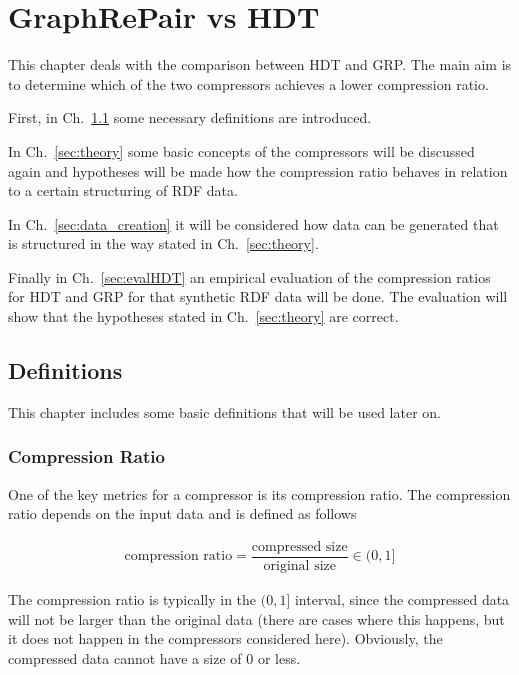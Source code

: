 \chapter{GraphRePair vs HDT}\label{ch:GRPvsHDT}

This chapter deals with the comparison between HDT and GRP. The main aim is to determine which of the two compressors achieves a lower compression ratio.

First, in Ch.~\ref{sec:definitions} some necessary definitions are introduced.

In Ch.~\ref{sec:theory} some basic concepts of the compressors will be discussed again and hypotheses will be made how the compression ratio behaves in relation to a certain structuring of RDF data. 

In Ch.~\ref{sec:data_creation} it will be considered how data can be generated that is structured in the way stated in Ch.~\ref{sec:theory}.

Finally in Ch.~\ref{sec:evalHDT} an empirical evaluation of the compression ratios for HDT and GRP for that synthetic RDF data will be done. The evaluation will show that the hypotheses stated in Ch.~\ref{sec:theory} are correct.

\section{Definitions}\label{sec:definitions}

This chapter includes some basic definitions that will be used later on.

\subsection{Compression Ratio}

One of the key metrics for a compressor is its compression ratio. The compression ratio depends on the input data and is defined as follows

\begin{align*}
\text{compression ratio} = \dfrac{\text{compressed size}}{\text{original size}} \in (0,1]
\end{align*}

The compression ratio is typically in the $(0,1]$ interval, since the compressed data will not be larger than the original data (there are cases where this happens, but it does not happen in the compressors considered here). Obviously, the compressed data cannot have a size of 0 or less.

